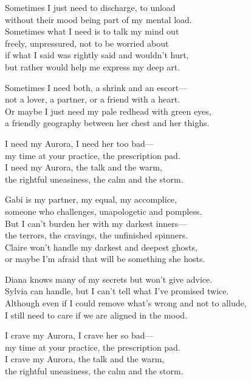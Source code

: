 \begin{lyrics}
Sometimes I just need to discharge, to unload\\
without their mood being part of my mental load.\\
Sometimes what I need is to talk my mind out\\
freely, unpressured, not to be worried about\\
if what I said was rightly said and wouldn't hurt,\\
but rather would help me express my deep art.

Sometimes I need both, a shrink and an escort—\\
not a lover, a partner, or a friend with a heart.\\
Or maybe I just need my pale redhead with green eyes,\\
a friendly geography between her chest and her thighs.

I need my Aurora, I need her too bad—\\
my time at your practice, the prescription pad.\\
I need my Aurora, the talk and the warm,\\
the rightful uneasiness, the calm and the storm.

Gabi is my partner, my equal, my accomplice,\\
someone who challenges, unapologetic and pompless.\\
But I can't burden her with my darkest inners—\\
the terrors, the cravings, the unfinished spinners.\\
Claire won't handle my darkest and deepest ghosts,\\
or maybe I'm afraid that will be something she hosts.

Diana knows many of my secrets but won't give advice.\\
Sylvia can handle, but I can't tell what I've promised twice.\\
Although even if I could remove what's wrong and not to allude,\\
I still need to care if we are aligned in the mood.

I crave my Aurora, I crave her so bad—\\
my time at your practice, the prescription pad.\\
I crave my Aurora, the talk and the warm,\\
the rightful uneasiness, the calm and the storm.


\end{lyrics}
